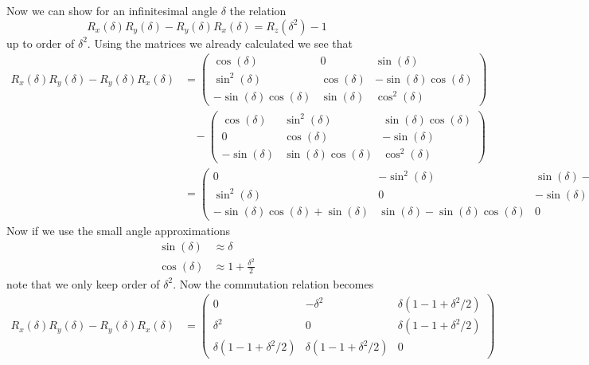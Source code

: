 \documentclass[11pt]{article}
\numberwithin{equation}{section}
\begin{document}
\begin{enumerate}[(a)]
Now we can show for an infinitesimal angle $\delta$ the relation
$$R_x(\delta)R_y(\delta) - R_y(\delta)R_x(\delta) = R_z(\delta^2) - 1$$
up to order of $\delta^2$. Using the matrices we already calculated we see that
\begin{align*}
R_x(\delta)R_y(\delta) - R_y(\delta)R_x(\delta) &= 
\left(\begin{array}{ccc}
      \cos(\delta)                &0               &\sin(\delta) \\
      \sin^2(\delta)             &\cos(\delta)    &-\sin(\delta)\cos(\delta) \\
      -\sin(\delta)\cos(\delta)   &\sin(\delta)    &\cos^2(\delta) 
      \end{array}\right)\\ 
&\ \ \ \ - \left(\begin{array}{ccc}
      \cos(\delta)    &\sin^2(\delta)  &\sin(\delta)\cos(\delta) \\
      0               &\cos(\delta)    &-\sin(\delta)  \\
      -\sin(\delta)    &\sin(\delta)\cos(\delta)   &\cos^2(\delta) 
      \end{array}\right)\\
&= \left(\begin{array}{ccc}
      0                &-\sin^2(\delta)  &\sin(\delta) - \sin(\delta)\cos(\delta) \\
      \sin^2(\delta)             &0    &-\sin(\delta)\cos(\delta) + \sin(\delta)\\
      -\sin(\delta)\cos(\delta)+\sin(\delta)   &\sin(\delta)-\sin(\delta)\cos(\delta)    &0 
      \end{array}\right)
\end{align*}
Now if we use the small angle approximations 
\begin{align*}
\sin(\delta) &\approx \delta\\
\cos(\delta) &\approx 1 + \frac{\delta^2}{2}
\end{align*}
note that we only keep order of $\delta^2$. Now the commutation relation becomes
\begin{align*}
R_x(\delta)R_y(\delta) - R_y(\delta)R_x(\delta) &= \left(\begin{array}{ccc}
      0                &-\delta^2  &\delta(1-1+\delta^2/2) \\
      \delta^2             &0    &\delta(1-1+\delta^2/2)\\
      \delta(1-1+\delta^2/2)   &\delta(1-1+\delta^2/2)    &0 
      \end{array}\right)\\

\end{align*}
\end{enumerate}
\end{document}
